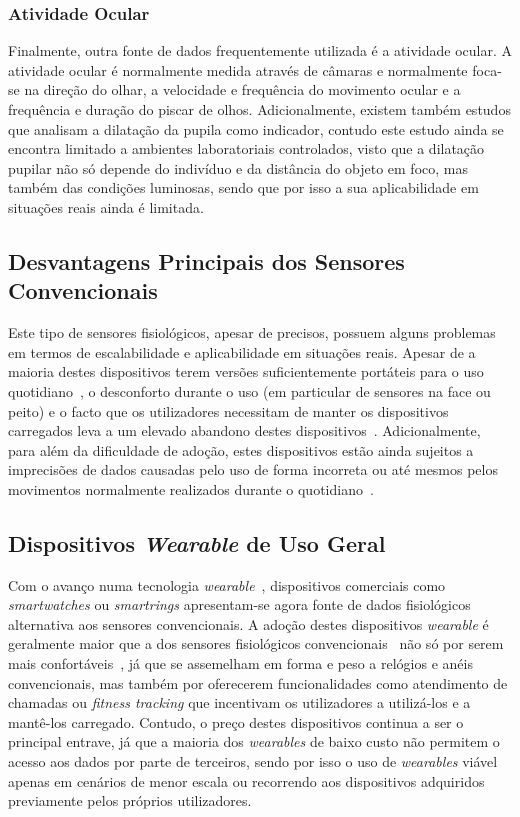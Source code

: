 \subsubsection{Atividade Ocular}

Finalmente, outra fonte de dados frequentemente utilizada é a atividade ocular. A atividade ocular é normalmente medida através de câmaras e normalmente foca-se na direção do olhar, a velocidade e frequência do movimento ocular e a frequência e duração do piscar de olhos. Adicionalmente, existem também estudos que analisam a dilatação da pupila como indicador, contudo este estudo ainda se encontra limitado a ambientes laboratoriais controlados, visto que a dilatação pupilar não só depende do indivíduo e da distância do objeto em foco, mas também das condições luminosas, sendo que por isso a sua aplicabilidade em situações reais ainda é limitada.

\subsection{Desvantagens Principais dos Sensores Convencionais}

Este tipo de sensores fisiológicos, apesar de precisos, possuem alguns problemas em termos de escalabilidade e aplicabilidade em situações reais. 
Apesar de a maioria destes dispositivos terem versões suficientemente portáteis para o uso quotidiano~\cite{Kallio2025}, o desconforto durante o uso (em particular de sensores na face ou peito) e o facto que os utilizadores necessitam de manter os dispositivos carregados leva a um elevado abandono destes dispositivos~\cite{Kallio2025}.
Adicionalmente, para além da dificuldade de adoção, estes dispositivos estão ainda sujeitos a imprecisões de dados causadas pelo uso de forma incorreta ou até mesmos pelos movimentos normalmente realizados durante o quotidiano~\cite{Kallio2025}.

\subsection{Dispositivos \textit{Wearable} de Uso Geral}

Com o avanço numa tecnologia \textit{wearable}~\cite{Kafkov2024}, dispositivos comerciais como \textit{smartwatches} ou \textit{smartrings} apresentam-se agora fonte de dados fisiológicos alternativa aos sensores convencionais.
A adoção destes dispositivos \textit{wearable} é geralmente maior que a dos sensores fisiológicos convencionais~\cite{Kallio2025} não só por serem mais confortáveis~\cite{Kallio2025}, já que se assemelham em forma e peso a relógios e anéis convencionais, mas também por oferecerem funcionalidades como atendimento de chamadas ou \textit{fitness tracking} que incentivam os utilizadores a utilizá-los e a mantê-los carregado.
Contudo, o preço destes dispositivos continua a ser o principal entrave, já que a maioria dos \textit{wearables} de baixo custo não permitem o acesso aos dados por parte de terceiros, sendo por isso o uso de \textit{wearables} viável apenas em cenários de menor escala ou recorrendo aos dispositivos adquiridos previamente pelos próprios utilizadores.

